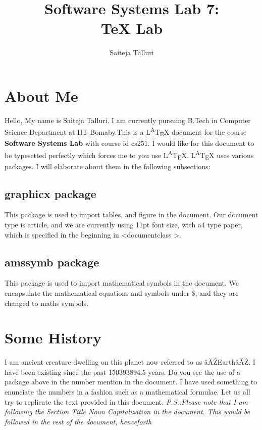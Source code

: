 \documentclass[11pt,a4paper]{article}
\begin{document}
\title {\textbf{Software Systems Lab 7:\\
	TeX Lab}}
\author{Saiteja Talluri}
\maketitle
\newpage
\tableofcontents
\newpage
\section{About Me}
Hello, My name is Saiteja Talluri.  I am currently pursuing B.Tech in Computer Science Department at IIT Bomaby.This is a  L\textsuperscript{A}T\textsubscript{E}X document for the course \textbf{Software Systems Lab} with course id cs251.  I would like for this document  to  be  typesetted  perfectly  which  forces  me  to  you  use  L\textsuperscript{A}T\textsubscript{E}X.  L\textsuperscript{A}T\textsubscript{E}X uses  various  packages.   I  will  elaborate  about  them  in  the  following
subsections:

\subsection{graphicx package{\normalfont}}
This  package  is  used  to  import  tables,  and  figure  in  the  document. Our document type is article, and we are currently using 11pt font size, with a4 type paper, which is specified in the beginning in
\textless documentclass \textgreater.

\subsection{amssymb package{\normalfont}}
This package is used to import mathematical symbols in the document.  We
encapsulate the mathematical equations and symbols under \$, and they are
changed to maths symbols.
\section{Some History}
I am ancient creature dwelling on this planet now referred to as \^{a}\u{A}\'{Z}Earth\^{a}\u{A}\.{Z}. I have been existing since the past 150393894.5 years.  Do you see the use of a package above in the number mention in the document.  I have used something  to  enunciate  the  numbers  in  a  fashion  such  as  a  mathematical formulae. Let us all try to replicate the text provided in this document. \emph{P.S.:Please note that I am following the Section Title Noun Capitalization in the document. This would be followed in the rest of the document,
henceforth}
\end{document}
